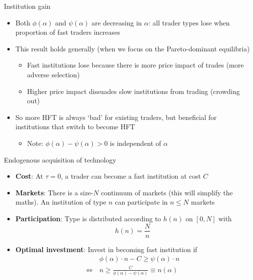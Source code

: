 \documentclass[english,10pt
,aspectratio=169
]{beamer}
\begin{document}
\begin{frame}{Institution gain}
	\begin{itemize}
		\item Both $\phi(\alpha)$ and $\psi(\alpha)$ are decreasing in $\alpha$: all trader types lose when proportion of fast traders increases
		\item This result holds generally (when we focus on the Pareto-dominant equilibria)
		\begin{itemize}
			\item Fast institutions lose because there is more price impact of trades (more adverse selection)
			\item Higher price impact dissuades slow institutions from trading 
			(crowding out)
		\end{itemize}
		\item So more HFT  is always `bad' for existing traders, but beneficial for institutions that switch to become HFT
		\begin{itemize}
			\item Note: $\phi(\alpha)-\psi(\alpha) > 0$ is independent of $\alpha$
		\end{itemize}
	\end{itemize}
\end{frame}


\begin{frame}{Endogenous acquisition of technology}
	\begin{itemize}
		\item \textbf{Cost}: At $\tau=0$, a trader can become a fast institution at cost $C$
		\item \textbf{Markets}: There is a size-$N$ continuum of markets (this will simplify the maths). An institution of type $n$ can participate in $n \leq N$ markets
		\item \textbf{Participation}: Type is distributed according to $h(n)$ on $[0, N]$ with
		\[
		h(n) = \frac{N}{n}
		\]
		\item \textbf{Optimal investment}: Invest in becoming fast institution if
		\begin{align*}
		& \phi(\alpha) \cdot n - C \geq \psi(\alpha) \cdot n  \\
		\Leftrightarrow \, & n \geq \frac{C}{\phi(\alpha)-\psi(\alpha)} \equiv n(\alpha)
		\end{align*}
	\end{itemize}
\end{frame}
\end{document}
